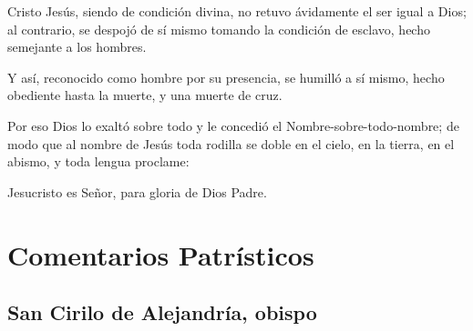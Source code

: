  


\begin{readprose}

Cristo Jesús, siendo de condición divina,
   no retuvo ávidamente el ser igual a Dios;
   al contrario, se despojó de sí mismo 
   tomando la condición de esclavo,
   hecho semejante a los hombres.

Y así, reconocido como hombre por su presencia,
   se humilló a sí mismo,
   hecho obediente hasta la muerte, 
   y una muerte de cruz.

Por eso Dios lo exaltó sobre todo
   y le concedió el Nombre-sobre-todo-nombre;
   de modo que al nombre de Jesús
   toda rodilla se doble
   en el cielo, en la tierra, en el abismo,
   y toda lengua proclame:

   Jesucristo es Señor,
   para gloria de Dios Padre.
\end{readprose}


 



\newsection
\section{Comentarios Patrísticos}

\subsection{San Cirilo de Alejandría, obispo}



